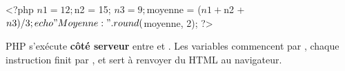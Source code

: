 
\begin{codephp}
<?php
  $n1 = 12; $n2 = 15; $n3 = 9;
  $moyenne = ($n1 + $n2 + $n3) / 3;
  echo "Moyenne : " . round($moyenne, 2);
?>
\end{codephp}

\begin{aretenir}
PHP s'exécute \textbf{côté serveur} entre  et . Les variables
commencent par \code{\$}, chaque instruction finit par \code{;}, et 
sert à renvoyer du HTML au navigateur.
\end{aretenir}

